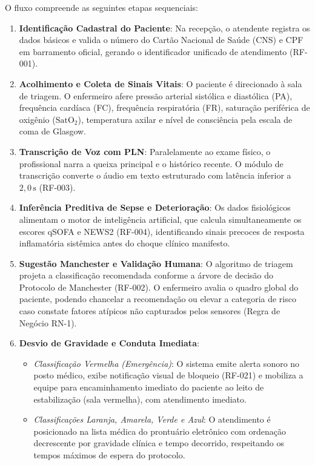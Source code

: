 O fluxo compreende as seguintes etapas sequenciais:
\begin{enumerate}[leftmargin=*]
    \item \textbf{Identificação Cadastral do Paciente}: Na recepção, o atendente registra os dados básicos e valida o número do Cartão Nacional de Saúde (CNS) e CPF em barramento oficial, gerando o identificador unificado de atendimento (RF-001).
    \item \textbf{Acolhimento e Coleta de Sinais Vitais}: O paciente é direcionado à sala de triagem. O enfermeiro afere pressão arterial sistólica e diastólica (PA), frequência cardíaca (FC), frequência respiratória (FR), saturação periférica de oxigênio ($\text{SatO}_2$), temperatura axilar e nível de consciência pela escala de coma de Glasgow.
    \item \textbf{Transcrição de Voz com PLN}: Paralelamente ao exame físico, o profissional narra a queixa principal e o histórico recente. O módulo de transcrição converte o áudio em texto estruturado com latência inferior a $2{,}0\,\text{s}$ (RF-003).
    \item \textbf{Inferência Preditiva de Sepse e Deterioração}: Os dados fisiológicos alimentam o motor de inteligência artificial, que calcula simultaneamente os escores qSOFA e NEWS2 \cite{singer_sepsis:2016} (RF-004), identificando sinais precoces de resposta inflamatória sistêmica antes do choque clínico manifesto.
    \item \textbf{Sugestão Manchester e Validação Humana}: O algoritmo de triagem projeta a classificação recomendada conforme a árvore de decisão do Protocolo de Manchester \cite{manchester:2014} (RF-002). O enfermeiro avalia o quadro global do paciente, podendo chancelar a recomendação ou elevar a categoria de risco caso constate fatores atípicos não capturados pelos sensores (Regra de Negócio RN-1).
    \item \textbf{Desvio de Gravidade e Conduta Imediata}:
    \begin{itemize}
        \item \textit{Classificação Vermelha (Emergência)}: O sistema emite alerta sonoro no posto médico, exibe notificação visual de bloqueio (RF-021) e mobiliza a equipe para encaminhamento imediato do paciente ao leito de estabilização (sala vermelha), com atendimento imediato.
        \item \textit{Classificações Laranja, Amarela, Verde e Azul}: O atendimento é posicionado na lista médica do prontuário eletrônico com ordenação decrescente por gravidade clínica e tempo decorrido, respeitando os tempos máximos de espera do protocolo.
    \end{itemize}
\end{enumerate}

